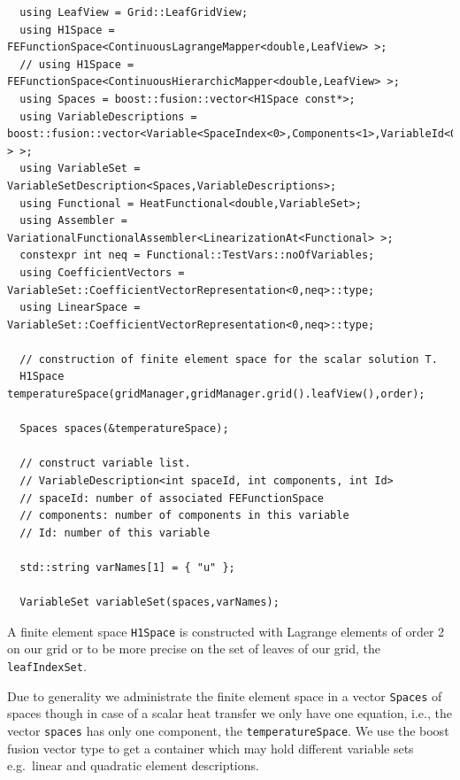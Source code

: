 \documentclass[11pt]{article}
\begin{document}
\begin{lstlisting}
  using LeafView = Grid::LeafGridView;
  using H1Space = FEFunctionSpace<ContinuousLagrangeMapper<double,LeafView> >;
  // using H1Space = FEFunctionSpace<ContinuousHierarchicMapper<double,LeafView> >;
  using Spaces = boost::fusion::vector<H1Space const*>;
  using VariableDescriptions = boost::fusion::vector<Variable<SpaceIndex<0>,Components<1>,VariableId<0> > >;
  using VariableSet = VariableSetDescription<Spaces,VariableDescriptions>;
  using Functional = HeatFunctional<double,VariableSet>;
  using Assembler = VariationalFunctionalAssembler<LinearizationAt<Functional> >;
  constexpr int neq = Functional::TestVars::noOfVariables;
  using CoefficientVectors = VariableSet::CoefficientVectorRepresentation<0,neq>::type;
  using LinearSpace = VariableSet::CoefficientVectorRepresentation<0,neq>::type;
    
  // construction of finite element space for the scalar solution T.
  H1Space temperatureSpace(gridManager,gridManager.grid().leafView(),order);
    
  Spaces spaces(&temperatureSpace);
    
  // construct variable list.
  // VariableDescription<int spaceId, int components, int Id>
  // spaceId: number of associated FEFunctionSpace
  // components: number of components in this variable
  // Id: number of this variable
        
  std::string varNames[1] = { "u" };
    
  VariableSet variableSet(spaces,varNames);
\end{lstlisting}

A finite element space {\tt H1Space} is constructed with Lagrange elements of order 2 on our grid or to be more precise on the set of leaves of our grid, the {\tt leafIndexSet}.

Due to generality we administrate the finite element space in a vector {\tt Spaces}  of spaces though in case of a scalar heat transfer we only have one equation, i.e., the vector {\tt spaces} has only one component, the {\tt temperatureSpace}.
We use the boost fusion vector type to get a container which may hold different variable sets e.g.\ linear and quadratic element descriptions.
\end{document}
